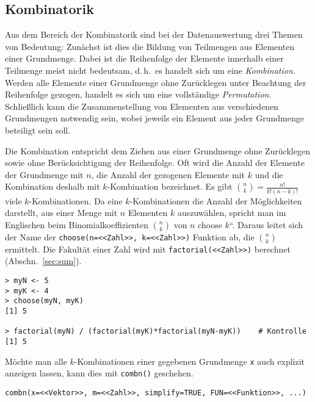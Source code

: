 \subsection{Kombinatorik}
\label{sec:combinatorics}

Aus dem Bereich der Kombinatorik sind bei der Datenauswertung drei Themen von Bedeutung: Zunächst ist dies die Bildung von Teilmengen aus Elementen einer Grundmenge. Dabei ist die Reihenfolge der Elemente innerhalb einer Teilmenge meist nicht bedeutsam, d.\,h.\ es handelt sich um eine \emph{Kombination}. Werden alle Elemente einer Grundmenge ohne Zurücklegen unter Beachtung der Reihenfolge gezogen, handelt es sich um eine vollständige \emph{Permutation}. Schließlich kann die Zusammenstellung von Elementen aus verschiedenen Grundmengen notwendig sein, wobei jeweils ein Element aus jeder Grundmenge beteiligt sein soll.

Die Kombination entspricht dem Ziehen aus einer Grundmenge ohne Zurücklegen sowie ohne Berücksichtigung der Reihenfolge. Oft wird die Anzahl der Elemente der Grundmenge mit $n$, die Anzahl der gezogenen Elemente mit $k$ und die Kombination deshalb mit $k$-Kombination bezeichnet. Es gibt ${n \choose k} = \frac{n!}{k! (n-k)!}$ viele $k$-Kombinationen. Da eine $k$-Kombinationen die Anzahl der Möglichkeiten darstellt, aus einer Menge mit $n$ Elementen $k$ auszuwählen, spricht man im Englischen beim Binomialkoeffizienten ${n \choose k}$ von {\quotedblbase}$n$ choose $k${\textquotedblleft}. Daraus leitet sich der Name der \lstinline!choose(n=<<Zahl>>, k=<<Zahl>>)! Funktion ab, die ${n \choose k}$ ermittelt. Die Fakultät einer Zahl wird mit \lstinline!factorial(<<Zahl>>)! berechnet (Abschn.\ \ref{sec:sum}).
\begin{lstlisting}
> myN <- 5
> myK <- 4
> choose(myN, myK)
[1] 5

> factorial(myN) / (factorial(myK)*factorial(myN-myK))    # Kontrolle
[1] 5
\end{lstlisting}

Möchte man alle $k$-Kombinationen einer gegebenen Grundmenge \lstinline!x! auch explizit anzeigen lassen, kann dies mit \lstinline!combn()! geschehen.
\begin{lstlisting}
combn(x=<<Vektor>>, m=<<Zahl>>, simplify=TRUE, FUN=<<Funktion>>, ...)
\end{lstlisting}

